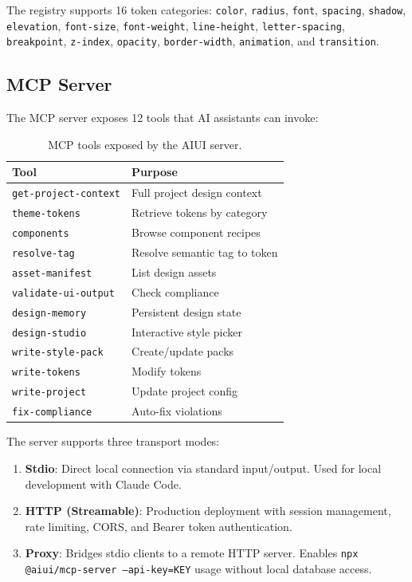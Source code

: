 \documentclass[11pt,twocolumn]{article}
\begin{document}
The registry supports 16 token categories: \texttt{color}, \texttt{radius}, \texttt{font}, \texttt{spacing}, \texttt{shadow}, \texttt{elevation}, \texttt{font-size}, \texttt{font-weight}, \texttt{line-height}, \texttt{letter-spacing}, \texttt{breakpoint}, \texttt{z-index}, \texttt{opacity}, \texttt{border-width}, \texttt{animation}, and \texttt{transition}.

\subsection{MCP Server}
The MCP server exposes 12 tools that AI assistants can invoke:

\begin{table}[h]
\centering
\small
\begin{tabular}{@{}ll@{}}
\toprule
\textbf{Tool} & \textbf{Purpose} \\
\midrule
\texttt{get-project-context} & Full project design context \\
\texttt{theme-tokens} & Retrieve tokens by category \\
\texttt{components} & Browse component recipes \\
\texttt{resolve-tag} & Resolve semantic tag to token \\
\texttt{asset-manifest} & List design assets \\
\texttt{validate-ui-output} & Check compliance \\
\texttt{design-memory} & Persistent design state \\
\texttt{design-studio} & Interactive style picker \\
\texttt{write-style-pack} & Create/update packs \\
\texttt{write-tokens} & Modify tokens \\
\texttt{write-project} & Update project config \\
\texttt{fix-compliance} & Auto-fix violations \\
\bottomrule
\end{tabular}
\caption{MCP tools exposed by the AIUI server.}
\label{tab:tools}
\end{table}

The server supports three transport modes:
\begin{enumerate}[nosep]
  \item \textbf{Stdio}: Direct local connection via standard input/output. Used for local development with Claude Code.
  \item \textbf{HTTP (Streamable)}: Production deployment with session management, rate limiting, CORS, and Bearer token authentication.
  \item \textbf{Proxy}: Bridges stdio clients to a remote HTTP server. Enables \texttt{npx @aiui/mcp-server --api-key=KEY} usage without local database access.
\end{enumerate}
\end{document}
